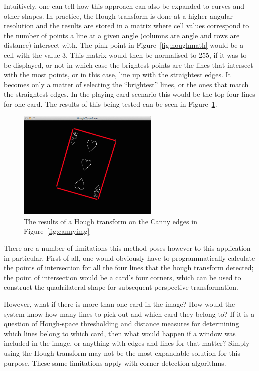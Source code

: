 \documentclass[a4paper,12pt,notitlepage]{article}
\begin{document}
			Intuitively, one can tell how this approach can also be expanded to curves and other shapes. In practice, the Hough transform is done at a higher angular resolution and the results are stored in a matrix where cell values correspond to the number of points a line at a given angle (columns are angle and rows are distance) intersect with. The pink point in Figure~\ref{fig:houghmath} would be a cell with the value 3. This matrix would then be normalised to 255, if it was to be displayed, or not in which case the brightest points are the lines that intersect with the most points, or in this case, line up with the straightest edges. It becomes only a matter of selecting the ``brightest'' lines, or the ones that match the straightest edges. In the playing card scenario this would be the top four lines for one card. The results of this being tested can be seen in Figure~\ref{fig:hough}.

			\begin{figure}[H]
				\centering
				\includegraphics[width=0.6\textwidth]{hough}
				\caption{The results of a Hough transform on the Canny edges in Figure~\ref{fig:cannyimg}}
				\label{fig:hough}
			\end{figure}

			There are a number of limitations this method poses however to this application in particular. First of all, one would obviously have to programmatically calculate the points of intersection for all the four lines that the hough transform detected; the point of intersection would be a card's four corners, which can be used to construct the quadrilateral shape for subsequent perspective transformation.

			However, what if there is more than one card in the image? How would the system know how many lines to pick out and which card they belong to? If it is a question of Hough-space thresholding and distance measures for determining which lines belong to which card, then what would happen if a window was included in the image, or anything with edges and lines for that matter? Simply using the Hough transform may not be the most expandable solution for this purpose. These same limitations apply with corner detection algorithms.
\end{document}
